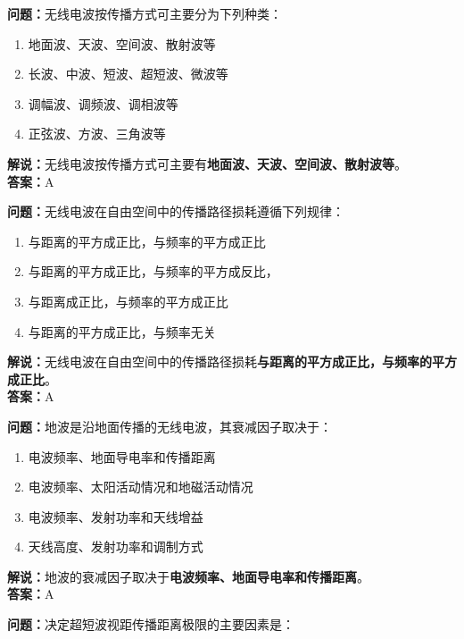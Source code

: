 \textbf{问题：}无线电波按传播方式可主要分为下列种类：

\begin{enumerate}[label=\Alph*), leftmargin=1.5cm]
	\item 地面波、天波、空间波、散射波等
	\item 长波、中波、短波、超短波、微波等
	\item 调幅波、调频波、调相波等
	\item 正弦波、方波、三角波等
\end{enumerate}

\textbf{解说：}无线电波按传播方式可主要有\textbf{地面波、天波、空间波、散射波等}。\\\textbf{答案：}A%



\textbf{问题：}无线电波在自由空间中的传播路径损耗遵循下列规律：

\begin{enumerate}[label=\Alph*), leftmargin=1.5cm]
	\item 与距离的平方成正比，与频率的平方成正比
	\item 与距离的平方成正比，与频率的平方成反比，
	\item 与距离成正比，与频率的平方成正比
	\item 与距离的平方成正比，与频率无关
\end{enumerate}

\textbf{解说：}无线电波在自由空间中的传播路径损耗\textbf{与距离的平方成正比，与频率的平方成正比}。\\\textbf{答案：}A%



\textbf{问题：}地波是沿地面传播的无线电波，其衰减因子取决于：

\begin{enumerate}[label=\Alph*), leftmargin=1.5cm]
	\item 电波频率、地面导电率和传播距离
	\item 电波频率、太阳活动情况和地磁活动情况
	\item 电波频率、发射功率和天线增益
	\item 天线高度、发射功率和调制方式
\end{enumerate}

\textbf{解说：}地波的衰减因子取决于\textbf{电波频率、地面导电率和传播距离}。\\\textbf{答案：}A%



\textbf{问题：}决定超短波视距传播距离极限的主要因素是：

